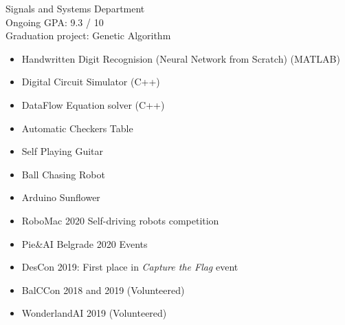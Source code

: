 


Signals and Systems Department\\
Ongoing GPA: 9.3 / 10
\\
\smallskip
{}
Graduation project: Genetic Algorithm








    \begin{itemize}
        \item Handwritten Digit Recognision (Neural Network from Scratch) (MATLAB)
        \item Digital Circuit Simulator (C++)
        \item DataFlow Equation solver (C++)
    \end{itemize}

    \begin{itemize}
        \item Automatic Checkers Table
        \item Self Playing Guitar
        \item Ball Chasing Robot
        \item Arduino Sunflower
    \end{itemize}
    
    
    \begin{itemize}
        \item RoboMac 2020 Self-driving robots competition
        \item Pie\&AI Belgrade 2020 Events
        \item DesCon 2019: First place in \textit{Capture the Flag} event
        \item BalCCon 2018 and 2019 (Volunteered)
        \item WonderlandAI 2019 (Volunteered)
    \end{itemize}
    
